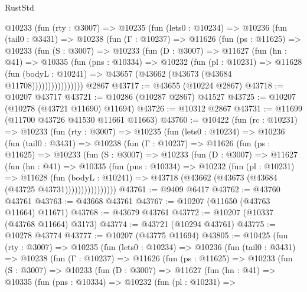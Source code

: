 \begin{lexlean}{RustStd}
\begin{coremodule}
      @10233
        (fun (rty : @3007) =>
        @10235
          (fun (lets0 : @10234) =>
          @10236
            (fun (tail0 : @3431) =>
            @10238
              (fun (Γ : @10237) =>
              @11626
                (fun (ps : @11625) =>
                @10233
                  (fun (S : @3007) =>
                  @10233
                    (fun (D : @3007) =>
                    @11627
                      (fun (hn : @41) =>
                      @10335
                        (fun (pns : @10334) =>
                        @10232
                          (fun (pl : @10231) =>
                          @11628
                            (fun (bodyL : @10241) =>
                            @43657 (@43662 (@43673 (@43684 @11708))))))))))))))))
    @2867
@43717 := @43655 (@10224 @2867)
@43718 := @10207 @43717
@43721 := @10286 (@10287 @2867) @41527
@43725 := @10207 (@10278 (@43721 @11690) @11694)
@43726 := @10312 @2867
@43731 := @11699 (@11700 @43726 @41530 @11661 @11663)
@43760 := @10422
    (fun (rc : @10231) =>
    @10233
      (fun (rty : @3007) =>
      @10235
        (fun (lets0 : @10234) =>
        @10236
          (fun (tail0 : @3431) =>
          @10238
            (fun (Γ : @10237) =>
            @11626
              (fun (ps : @11625) =>
              @10233
                (fun (S : @3007) =>
                @10233
                  (fun (D : @3007) =>
                  @11627
                    (fun (hn : @41) =>
                    @10335
                      (fun (pns : @10334) =>
                      @10232
                        (fun (pl : @10231) =>
                        @11628
                          (fun (bodyL : @10241) =>
                          @43718 (@43662 (@43673 (@43684 (@43725 @43731))))))))))))))))
@43761 := @9409 @6417
@43762 := @43760 @43761
@43763 := @43668 @43761
@43767 := @10207 (@11650 (@43763 @11664) @11671)
@43768 := @43679 @43761
@43772 := @10207 (@10337 (@43768 @11664) @3173)
@43774 := @43721 (@10294 @43761)
@43775 := @10278 @43774
@43777 := @10207 (@43775 @11694)
@43805 := @10425
    (fun (rty : @3007) =>
    @10235
      (fun (lets0 : @10234) =>
      @10236
        (fun (tail0 : @3431) =>
        @10238
          (fun (Γ : @10237) =>
          @11626
            (fun (ps : @11625) =>
            @10233
              (fun (S : @3007) =>
              @10233
                (fun (D : @3007) =>
                @11627
                  (fun (hn : @41) =>
                  @10335
                    (fun (pns : @10334) =>
                    @10232
                      (fun (pl : @10231) =>

\end{coremodule}
\end{lexlean}

